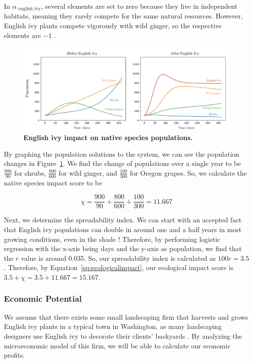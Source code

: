 In \(\alpha_{\text{ english ivy}}\), several elements are set to zero because they live in independent habitats, meaning they rarely compete for the same natural resources. However, English ivy plants compete vigorously with wild ginger, so the respective elements are \(-1\) \cite{portlandnurseryAsarumCaudatum}.

\begin{figure}[h!]
\centering
    \includegraphics[scale=0.5]{figures/lotkavolterraenglishivy.pdf}
    \captionsetup{width=0.9\textwidth}
    \caption{\textbf{English ivy impact on native species populations.}}
    \label{fig:lotkavolterraenglishivy}
\end{figure}

By graphing the population solutions to the system, we can see the population changes in Figure~\ref{fig:lotkavolterraenglishivy}. We find the change of populations over a single year to be \(\frac{900}{90}\) for shrubs, \(\frac{800}{600}\) for wild ginger, and \(\frac{100}{300}\) for Oregon grapes. So, we calculate the native species impact score to be

\[\chi = \frac{900}{90} + \frac{800}{600} + \frac{100}{300} = 11.667\]

Next, we determine the spreadability index. We can start with an accepted fact that English ivy populations can double in around one and a half years in most growing conditions, even in the shade \cite{usdaHederaHelix}! Therefore, by performing logistic regression with the x-axis being days and the y-axis as population, we find that the \(r\) value is around 0.035. So, our spreadability index is calculated as \(100r = 3.5\). Therefore, by Equation~\ref{eq:ecologicalimpact}, our ecological impact score is \(3.5 + \chi = 3.5 + 11.667 = 15.167\).

\subsubsection{Economic Potential}
We assume that there exists some small landscaping firm that harvests and grows English ivy plants in a typical town in Washington, as many landscaping designers use English ivy to decorate their clients' backyards \cite{psuEnglishLandscape}. By analyzing the microeconomic model of this firm, we will be able to calculate our economic profits.

